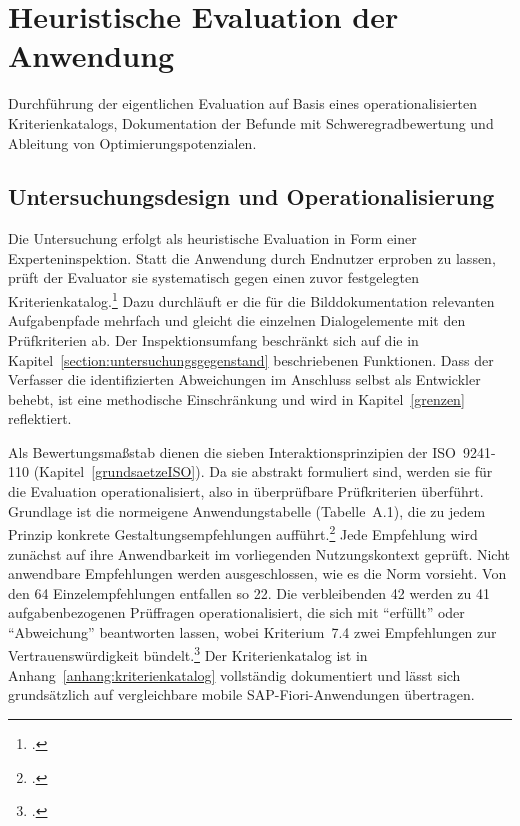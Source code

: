 \chapter{Heuristische Evaluation der Anwendung}
\label{chapter:kapitel4}
Durchführung der eigentlichen Evaluation auf Basis eines operationalisierten
Kriterienkatalogs, Dokumentation der Befunde mit Schweregradbewertung und
Ableitung von Optimierungspotenzialen.

\section{Untersuchungsdesign und Operationalisierung}
\label{section:untersuchungsdesign}

Die Untersuchung erfolgt als heuristische Evaluation in Form einer
Experteninspektion.
Statt die Anwendung durch Endnutzer erproben zu lassen, prüft der Evaluator sie
systematisch gegen einen zuvor festgelegten
Kriterienkatalog.\footcite[Vgl.][S.~254 f.]{nielsen1990heuristic}
Dazu durchläuft er die für die Bilddokumentation relevanten Aufgabenpfade
mehrfach und gleicht die einzelnen Dialogelemente mit den Prüfkriterien ab.
Der Inspektionsumfang beschränkt sich auf die in
Kapitel~\ref{section:untersuchungsgegenstand} beschriebenen Funktionen.
Dass der Verfasser die identifizierten Abweichungen im Anschluss selbst als
Entwickler behebt, ist eine methodische Einschränkung und wird in
Kapitel~\ref{grenzen} reflektiert.

Als Bewertungsmaßstab dienen die sieben Interaktionsprinzipien der ISO~9241-110
(Kapitel~\ref{grundsaetzeISO}).
Da sie abstrakt formuliert sind, werden sie für die Evaluation operationalisiert,
also in überprüfbare Prüfkriterien überführt.
Grundlage ist die normeigene Anwendungstabelle (Tabelle~A.1), die zu jedem
Prinzip konkrete Gestaltungsempfehlungen
aufführt.\footcite[Vgl.][Tabelle~A.1]{DIN_ISO_9241-110:2020}
Jede Empfehlung wird zunächst auf ihre Anwendbarkeit im vorliegenden
Nutzungskontext geprüft.
Nicht anwendbare Empfehlungen werden ausgeschlossen, wie es die Norm vorsieht.
Von den 64 Einzelempfehlungen entfallen so 22.
Die verbleibenden 42 werden zu 41 aufgabenbezogenen Prüffragen operationalisiert,
die sich mit \enquote{erfüllt} oder \enquote{Abweichung} beantworten lassen,
wobei Kriterium~7.4 zwei Empfehlungen zur Vertrauenswürdigkeit
bündelt.\footcite[Vgl.][Tabelle~A.1]{DIN_ISO_9241-110:2020}
Der Kriterienkatalog ist in Anhang~\ref{anhang:kriterienkatalog} vollständig
dokumentiert und lässt sich grundsätzlich auf vergleichbare mobile
SAP-Fiori-Anwendungen übertragen.

